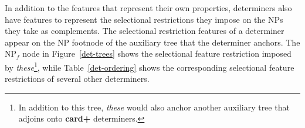 \addtocounter{footnote}{-3}


In addition to the features that represent their own properties, determiners
also have features to represent the selectional
restrictions they impose on the NPs they take as complements.  The
selectional restriction features of a determiner appear on the NP footnode of
the auxiliary tree that the determiner anchors.  The NP$_{f}$ node in Figure~\ref{det-trees} shows the selectional feature
restriction imposed by {\it these}\footnote{In addition to this tree, {\it
these} would also anchor another auxiliary tree that adjoins onto {\bf card+}
determiners.}, while Table~\ref{det-ordering} shows the corresponding
selectional feature restrictions of several other determiners.
\small
